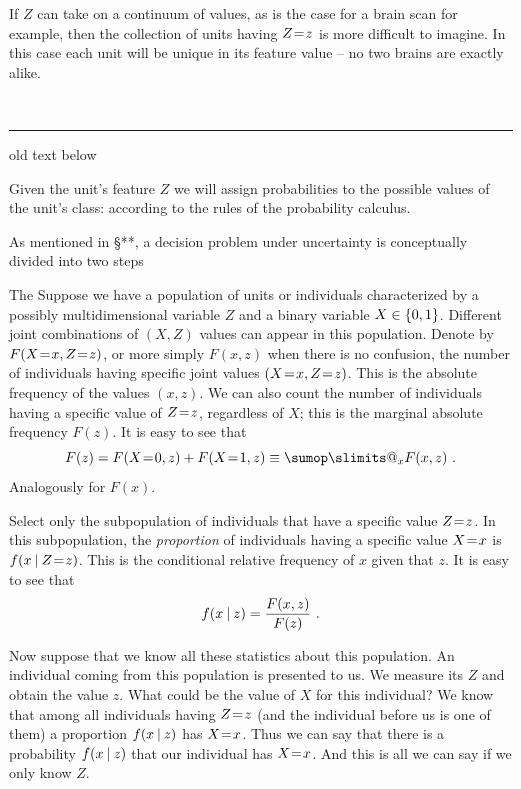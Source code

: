 \documentclass[\ifafour a4paper,12pt,\else a5paper,10pt,\fi%
onecolumn,oneside,article,%
british%
]{memoir}
\makeatletter
\theoremstyle{remark}
\theoremstyle{innote}
\def\sum{\DOTSI\sumop\slimits@}
\newcommand*{\wrench}{{\fontencoding{U}\fontfamily{fontawesomethree}\selectfont\symbol{114}}}
\newcommand{\mynotew}[1]{{\footnotesize\color{notecolour}\wrench\ #1}}
\DeclarePairedDelimiter\set{\{}{\}} %
\renewcommand*{\|}[1][]{\nonscript\:#1\vert\nonscript\:\mathopen{}}
\newcommand*{\mo}[1][=]{\mathrel{\mkern-3.5mu#1\mkern-3.5mu}}
\newcommand*{\sect}{\S}%
\makeatother
\begin{document}
If $Z$ can take on a continuum of values, as is the case for a brain scan for example, then the collection of units having $Z\mo z$ is more difficult to imagine. In this case each unit will be unique in its feature value -- no two brains are exactly alike.




\mynotew{\medskip\hrule old text below}

Given the unit's feature $Z$ we will assign probabilities to the possible values of the unit's class:  according to the rules of the probability calculus.

As mentioned in \sect***, a decision problem under uncertainty is conceptually divided into two steps 

The Suppose we have a population of units or individuals characterized by a possibly multidimensional variable $Z$ and a binary variable $X \in \set{0,1}$. Different joint combinations of $(X,Z)$ values can appear in this population. Denote by $F(X\mo x, Z\mo z)$, or more simply $F(x, z)$ when there is no confusion, the number of individuals having specific joint values $(X\mo x, Z\mo z)$. This is the absolute frequency of the values $(x,z)$. We can also count the number of individuals having a specific value of $Z\mo z$, regardless of $X$; this is the marginal absolute frequency $F(z)$. It is easy to see that
\begin{equation}
  \label{eq:marginal_prob}
  F(z) = F(X\mo 0, z) + F(X\mo 1, z) \equiv \sum_{x} F(x,z)\ .
\end{equation}
Analogously for $F(x)$.

Select only the subpopulation of individuals that have a specific value $Z\mo z$. In this subpopulation, the \emph{proportion} of individuals having a specific value $X\mo x$ is $f(x\| Z\mo z)$. This is the conditional relative frequency of $x$ given that $z$. It is easy to see that
\begin{equation}
  \label{eq:cond_prob}
  f(x \| z) = \frac{F(x,z)}{F(z)} \ .
\end{equation}

Now suppose that we know all these statistics about this population. An
individual coming from this population is presented to us. We measure its
$Z$ and obtain the value $z$. What could be the value of $X$ for this
individual? We know that among all individuals having $Z\mo z$ (and the
individual before us is one of them) a proportion $f(x \| z)$ has $X\mo x$.
Thus we can say that there is a probability $f(x \| z)$ that our individual
has $X\mo x$. And this is all we can say if we only know $Z$.
\end{document}
